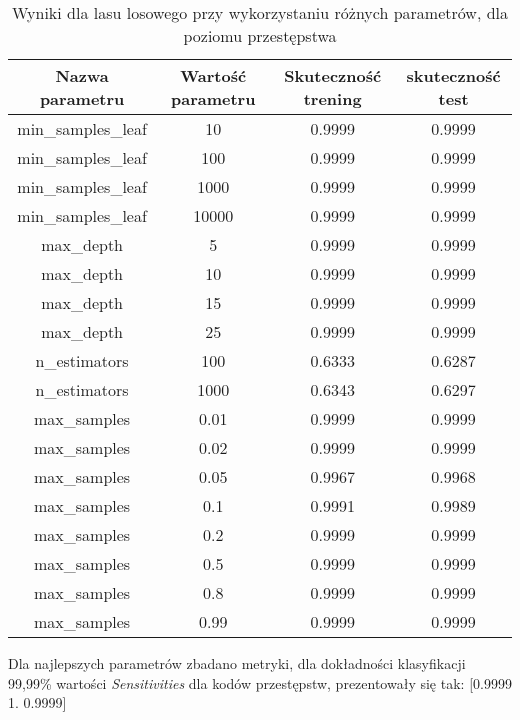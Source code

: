 \documentclass{classrep}
\begin{document}
{{    
\begin{table}
    \centering
    \begin{tabular}{|c|c|c|c|}
        \hline
      Nazwa parametru & Wartość parametru & Skuteczność trening & skuteczność test \\ \hline
            min\_samples\_leaf & 10 & 0.9999 & 0.9999 \\ \hline
            min\_samples\_leaf & 100 & 0.9999 & 0.9999 \\ \hline
            min\_samples\_leaf & 1000 & 0.9999 & 0.9999 \\ \hline
            min\_samples\_leaf & 10000 & 0.9999 & 0.9999 \\ \hline
            max\_depth & 5 & 0.9999 & 0.9999 \\ \hline
            max\_depth & 10 & 0.9999 & 0.9999 \\ \hline
            max\_depth & 15 & 0.9999 & 0.9999 \\ \hline
            max\_depth & 25 & 0.9999 & 0.9999 \\ \hline
            n\_estimators & 100 & 0.6333 & 0.6287 \\ \hline
            n\_estimators & 1000 & 0.6343 & 0.6297 \\ \hline
            
            max\_samples & 0.01 & 0.9999 & 0.9999 \\ \hline
            max\_samples & 0.02 & 0.9999 & 0.9999 \\ \hline
            max\_samples & 0.05 & 0.9967 & 0.9968 \\ \hline
            max\_samples & 0.1 & 0.9991 & 0.9989 \\ \hline
            max\_samples & 0.2 & 0.9999 & 0.9999 \\ \hline
            max\_samples & 0.5 & 0.9999 & 0.9999 \\ \hline
            max\_samples & 0.8 & 0.9999 & 0.9999 \\ \hline
            max\_samples & 0.99 & 0.9999 & 0.9999 \\ \hline

            \hline
    \end{tabular}
    \caption{Wyniki dla lasu losowego przy wykorzystaniu różnych parametrów, dla poziomu przestępstwa}
    \label{tab:forest_parameters_law_breaking_law}
\end{table}
                \FloatBarrier
                
                
                Dla najlepszych parametrów zbadano metryki, dla dokładności klasyfikacji 99,99\% wartości \textit{Sensitivities} dla kodów przestępstw, prezentowały się tak:
                [0.9999 1.     0.9999]
   
}}
\end{document}
